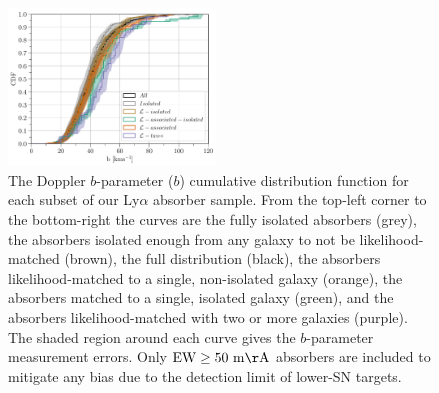 \documentclass[twocolumn,tighten]{aastex62}
\begin{document}
\begin{figure}[ht!]
        \centering
        \vspace{0pt}
        \includegraphics[width=0.49\textwidth]{hist(b)_all6_bins1_EWcut50-10000_errTrue_dataset_double.pdf}
        \caption{\small{The Doppler $b$-parameter ($b$) cumulative distribution function for each subset of our Ly$\alpha$ absorber sample. From the top-left corner to the bottom-right the curves are the fully isolated absorbers (grey), the absorbers isolated enough from any galaxy to not be likelihood-matched (brown), the full distribution (black), the absorbers likelihood-matched to a single, non-isolated galaxy (orange), the absorbers matched to a single, isolated galaxy (green), and the absorbers likelihood-matched with two or more galaxies (purple). The shaded region around each curve gives the $b$-parameter measurement errors. Only $\rm EW \ge 50~m\AA$ absorbers are included to mitigate any bias due to the detection limit of lower-SN targets.}}
        \vspace{5pt}
        \label{cdf_b}
\end{figure}
\end{document}
